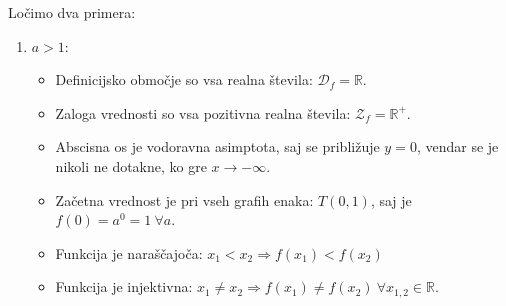 \noindent Ločimo dva primera:
\begin{enumerate}
\item $a > 1$:
%
\begin{itemize}
\item Definicijsko območje so vsa realna števila: $\mathcal{D}_f = \mathbb{R}$.
\item Zaloga vrednosti so vsa pozitivna realna števila: $\mathcal{Z}_f = \mathbb{R}^+$.
\item Abscisna os je vodoravna asimptota, saj se približuje $y = 0$, vendar se je nikoli ne dotakne, ko gre $x \rightarrow -\infty$.
\item Začetna vrednost je pri vseh grafih enaka: $T(0,1)$, saj je $f(0) = a^0 = 1~\forall a$.
\item Funkcija je naraščajoča: $x_1 < x_2 \Rightarrow f(x_1) < f(x_2)$
\item Funkcija je injektivna: $x_1 \neq x_2 \Rightarrow f(x_1) \neq f(x_2)~\forall x_{1, 2} \in \mathbb{R}$.


\end{itemize}
\end{enumerate}
